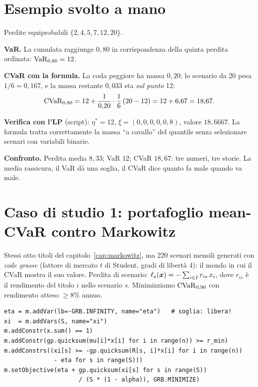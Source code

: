 \section{Esempio svolto a mano}

\begin{esempio}[Sei scenari, $\alpha = 0{,}80$]
Perdite equiprobabili $\{2, 4, 5, 7, 12, 20\}$.

\textbf{VaR.} La cumulata raggiunge $0{,}80$ in corrispondenza della quinta perdita
ordinata: $\mathrm{VaR}_{0,80} = 12$.

\textbf{CVaR con la formula.} La coda peggiore ha massa $0{,}20$; lo scenario da 20
pesa $1/6 = 0{,}167$, e la massa restante $0{,}033$ sta \emph{sul punto} 12:
\[
\mathrm{CVaR}_{0,80} = 12 + \frac{1}{0{,}20} \cdot \frac{1}{6}\,(20 - 12)
= 12 + 6{,}67 = 18{,}67 .
\]

\textbf{Verifica con l'LP} (script): $\eta^* = 12$, $\xi = (0,0,0,0,0,8)$, valore
$18{,}6667$. La formula tratta correttamente la massa ``a cavallo'' del quantile
senza selezionare scenari con variabili binarie.

\textbf{Confronto.} Perdita media $8{,}33$; VaR $12$; CVaR $18{,}67$: tre numeri,
tre storie. La media rassicura, il VaR dà una soglia, il CVaR dice quanto fa male
quando va male.
\end{esempio}

\section{Caso di studio 1: portafoglio mean-CVaR contro Markowitz}

Stessi otto titoli del capitolo~\ref{cap:markowitz}, ma 220 scenari mensili generati
con \emph{code grasse} (fattore di mercato $t$ di Student, gradi di libertà 4):
il mondo in cui il CVaR mostra il suo valore. Perdita di scenario:
$\ell_s(\boldsymbol{x}) = -\sum_{i \in I} r_{is}\, x_i$, dove $r_{is}$ è il rendimento del titolo $i$ nello scenario $s$. Minimizziamo $\mathrm{CVaR}_{0,90}$ con rendimento atteso
$\ge 8\%$ annuo.

\begin{lstlisting}[style=python]
eta = m.addVar(lb=-GRB.INFINITY, name="eta")   # soglia: libera!
xi  = m.addVars(S, name="xi")
m.addConstr(x.sum() == 1)
m.addConstr(gp.quicksum(mu[i]*x[i] for i in range(n)) >= r_min)
m.addConstrs((xi[s] >= -gp.quicksum(R[s, i]*x[i] for i in range(n))
              - eta for s in range(S)))
m.setObjective(eta + gp.quicksum(xi[s] for s in range(S))
                     / (S * (1 - alpha)), GRB.MINIMIZE)
\end{lstlisting}


